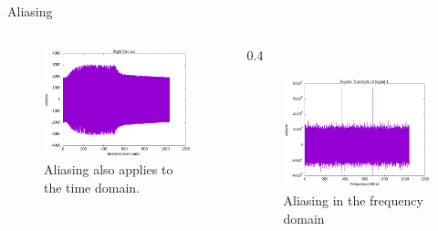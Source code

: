 \documentclass[10pt, aspectratio=168]{beamer}
\begin{document}
    \begin{frame}{Aliasing}
    \begin{columns}
        \begin{column}{0.4\textwidth}
            \begin{figure}[h]
                \centering
                \includegraphics[width=1\textwidth]{time-aliasing.png}
                \caption{Aliasing also applies to the time domain.}
                \label{fig:time-aliasing}
            \end{figure}
        \end{column}
        \begin{column} {0.4\textwidth}
            \begin{figure}[h]
                \centering 
                \includegraphics[width=1\textwidth]{fft_test_08.png}
                \caption{Aliasing in the frequency domain}
                \label{fig:fft-test-08}
            \end{figure}
        \end{column}
    \end{columns}
    \end{frame}
    
\end{document}
